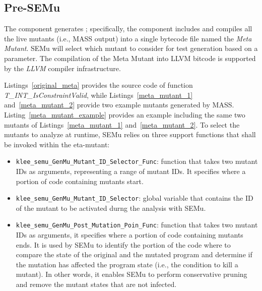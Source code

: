 




\subsection{Pre-SEMu}

The  component generates ; specifically, the component includes and compiles all the live mutants (i.e., MASS output) into a single bytecode file named the \emph{Meta Mutant}. SEMu will select which mutant to consider for test generation based on a parameter. The compilation of the Meta Mutant into LLVM bitcode is supported by the \emph{LLVM} compiler infrastructure.



Listings~\ref{original_meta} provides the source code of function \emph{T\_INT\_IsConstraintValid}, while Listings~\ref{meta_mutant_1} and~\ref{meta_mutant_2} provide two example mutants generated by MASS.
Listing~\ref{meta_mutant_example} provides an example  including the same two mutants of Listings~\ref{meta_mutant_1} and~\ref{meta_mutant_2}.
To select the mutants to analyze at runtime, SEMu relies on three support functions that shall be invoked within the eta-mutant:

\begin{itemize}
	\item \texttt{klee\_semu\_GenMu\_Mutant\_ID\_Selector\_Func}: function that takes two mutant IDs as arguments, representing a range of mutant IDs. It specifies where a portion of code containing mutants start.
    \item \texttt{klee\_semu\_GenMu\_Mutant\_ID\_Selector}: global variable that contains the ID of the mutant to be activated durng the analysis with SEMu.
	\item \texttt{klee\_semu\_GenMu\_Post\_Mutation\_Poin\_Func}:
	function that takes two mutant IDs as arguments, it specifies where a portion of code containing mutants ends.
	It is used by SEMu to identify the portion of the code where to compare the state of the original and the mutated program and determine if the mutation has affected the program state (i.e., the  condition to kill a mutant). In other words, it enables SEMu to perform conservative pruning and remove the mutant states that are not infected.
\end{itemize}

